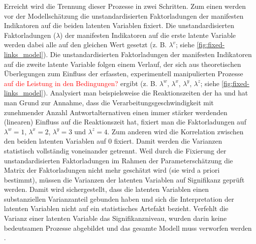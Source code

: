\documentclass[11pt, twoside, a4paper]{book}		%
\begin{document}
Erreicht wird die Trennung dieser Prozesse in zwei Schritten. Zum einen werden vor der Modellschätzung die unstandardisierten Faktorladungen der manifesten Indikatoren auf die beiden latenten Variablen fixiert. Die unstandardisierten Faktorladungen ($\lambda$) der manifesten Indikatoren auf die erste latente Variable werden dabei alle auf den gleichen Wert gesetzt (z. B. $\lambda^{v}$; siehe \autoref{fig:fixed-links_model}). 
Die unstandardisierten Faktorladungen der manifesten Indikatoren auf die zweite latente Variable folgen einem Verlauf, der sich aus theoretischen Überlegungen zum Einfluss der erfassten, experimentell manipulierten Prozesse \textcolor{red}{auf die Leistung in den Bedingungen?} ergibt (z. B. $\lambda^{w}$, $\lambda^{x}$, $\lambda^{y}$, $\lambda^{z}$; siehe \autoref{fig:fixed-links_model}). Analysiert man beispielsweise die Reaktionszeiten der \gls{ha} und hat man Grund zur Annahme, dass die Verarbeitungsgeschwindigkeit mit zunehmender Anzahl Antwortalternativen einen immer stärker werdenden (linearen) Einfluss auf die Reaktionszeit hat, fixiert man die Faktorladungen auf $\lambda^{w}=1$, $\lambda^{x}=2$, $\lambda^{y}=3$ und $\lambda^{z}=4$. 
Zum anderen wird die Korrelation zwischen den beiden latenten Variablen auf $0$ fixiert. Damit werden die Varianzen statistisch vollständig voneinander getrennt.
Weil durch die Fixierung der unstandardisierten Faktorladungen im Rahmen der Parameterschätzung die Matrix der Faktorladungen nicht mehr geschätzt wird (sie wird a priori bestimmt), müssen die Varianzen der latenten Variablen auf Signifikanz geprüft werden. 
Damit wird sichergestellt, dass die latenten Variablen einen substanziellen Varianzanteil gebunden haben und sich die Interpretation der latenten Variablen nicht auf ein statistisches Artefakt bezieht. Verfehlt die Varianz einer latenten Variable das Signifikanzniveau, wurden darin keine bedeutsamen Prozesse abgebildet und das gesamte Modell muss verworfen werden \citep[z. B.][]{Schweizer2006a, Schweizer2006b, Schweizer2007, Schweizer2008, Schweizer2009a}.
\end{document}
